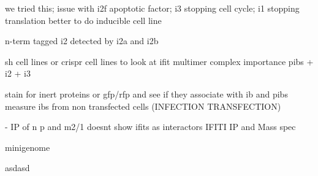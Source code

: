 we tried this; issue with i2f apoptotic factor; i3 stopping cell cycle; i1 stopping translation
better to do inducible cell line

n-term tagged i2 detected by i2a and i2b

sh cell lines or crispr cell lines to look at ifit multimer complex importance
pibs + i2 + i3

stain for inert proteins or gfp/rfp and see if they associate with ib and pibs
measure ibs from non transfected cells (INFECTION TRANSFECTION)

\cite{Oliveira2013HumanCells} - IP of n p and m2/1 doesnt show ifits as interactors
IFITI IP and Mass spec

minigenome

asdasd




